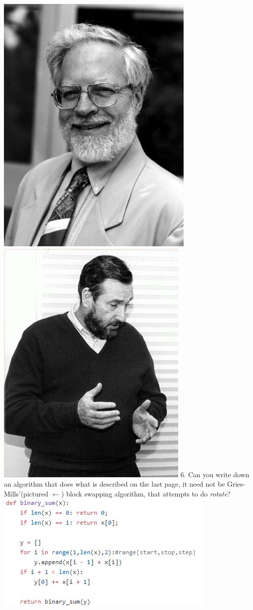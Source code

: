 \documentclass[12pt]{article}
\begin{document}
\includegraphics[scale = 0.25]{gries.jpg}\includegraphics[scale = 0.25]{mills.jpg}
6. Can you write down an algorithm that does what is described on the last page, it need not be Gries-Mills'(pictured $\leftarrow$) block swapping algorithm, that attempts to do \textit{rotate}?
\newpage
\noindent \includegraphics[scale = 0.85]{rec.jpg}\\
\end{document}
